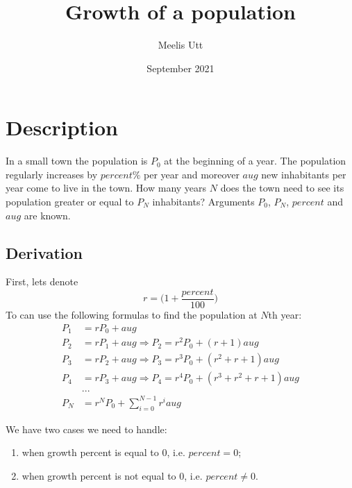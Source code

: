 \documentclass[12pt]{article}
\title{Growth of a population}
\author{Meelis Utt}
\date{September 2021}
\begin{document}
\maketitle

\section*{Description}
In a small town the population is $P_0$ at the beginning of a year.
The population regularly increases by $percent\%$ per year and moreover $aug$ new inhabitants per year come to live in the town.
How many years $N$ does the town need to see its population greater or equal to $P_N$ inhabitants?
Arguments $P_0$, $P_N$, $percent$ and $aug$ are known.

\subsection*{Derivation}
First, lets denote
\begin{equation*}
    r = \bigg(1+\frac{percent}{100}\bigg)
\end{equation*}
To can use the following formulas to find the population at $N$th year:
\begin{align}
    \nonumber P_1 &= rP_0 + aug\\
    \nonumber P_2 &= rP_1 + aug \Rightarrow P_2 = r^{2}P_0 + (r + 1)aug\\
    \nonumber P_3 &= rP_2 + aug \Rightarrow P_3 = r^{3}P_0 + (r^{2} + r + 1)aug\\
    \nonumber P_4 &= rP_3 + aug \Rightarrow P_4 = r^{4}P_0 + (r^{3} + r^{2} + r + 1)aug\\
    \nonumber &...\\
    P_N &= r^{N}P_0 + \sum_{i=0}^{N-1}r^{i}aug \label{growth-fun}
\end{align}

We have two cases we need to handle:
\begin{enumerate}
    \item when growth percent is equal to $0$, i.e. $percent = 0$;
    \item when growth percent is not equal to $0$, i.e. $percent \ne 0$.
\end{enumerate}
\end{document}
